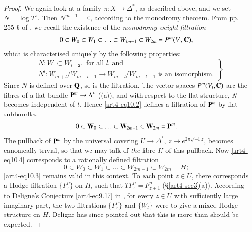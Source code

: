 \begin{proof}
We again look at a family $\pi: X \to \Delta^\ast$, as described above, and we set $N = \log T^k$. Then $N^{m+1} =0$, according to the monodromy theorem. From pp. 255-6 of \cite{art4-key21}, we recall the existence of the \textit{monodromy weight filtration}
\begin{equation}
 0 \subset W_0 \subset W_1 \subset \ldots \subset W_{2m-1} \subset W_{2m} = P^m (V_t, \mathbf{C}), \label{art4-eq10.2}
\end{equation}
which is characterised uniquely by the following properties:
\begin{equation}
\left. 
\begin{aligned}
& N: W_l \subset W_{l-2}, \text{ for all $l$, and }\\
& N^l : W_{m+l}/ W_{m+l-1} \to W_{m-l} /W_{m-l-1} \text{ is an isomorphism.} 
\end{aligned}
\right\}
\label{art4-eq10.3}
\end{equation}
Since $N$ is defined over $\mathbf{Q}$, so is the filtration. The vector spaces $P^m (V_t, \mathbf{C})$ are the fibres of a flat bundle $\mathbf{P}^m \to \Delta^\ast$ ((a)), and with respect to the flat structure, $N$ becomes independent of $t$. Hence \eqref{art4-eq10.2} defines a filtration of $\mathbf{P}^m$ by flat subbundles
\begin{equation}
0 \subset \mathbf{W}_0 \subset \ldots \subset \mathbf{W}_{2m-1} \subset \mathbf{W}_{2m} = \mathbf{P}^m. \label{art4-eq10.4}
\end{equation}
The pullback of $\mathbf{P}^m$ by the universal covering $U \to \Delta^\ast$, $z \longmapsto e^{2\pi \sqrt{-1}z}$, becomes canonically trivial, so that we may talk of \textit{the} fibre $H$ of this pullback. Now \eqref{art4-eq10.4} corresponds to a rationally defined filtration
\begin{equation}
0 \subset W_0 \subset W_1 \subset \ldots \subset W_{2m-1} \subset W_{2m} = H; 
\label{art4-eq10.5}
\end{equation}
\eqref{art4-eq10.3} remains valid in this context. To each point $z \in U$, there corresponds a Hodge filtration $\{F^p_z\}$ on $H$, such that $T F^p_z = F^p_{z+1}$ (\cf \S \ref{art4-sec3}(a)). According to Deligne's Conjecture \eqref{art4-eq9.17} in \cite{art4-key21}, for every $z \in U$ with sufficiently large imaginary part, the two filtrations $\{F^p_z\}$ and $\{W_l\}$ were to give a mixed Hodge structure on $H$. Deligne has since pointed out that this is more than should be expected.


\end{proof}
